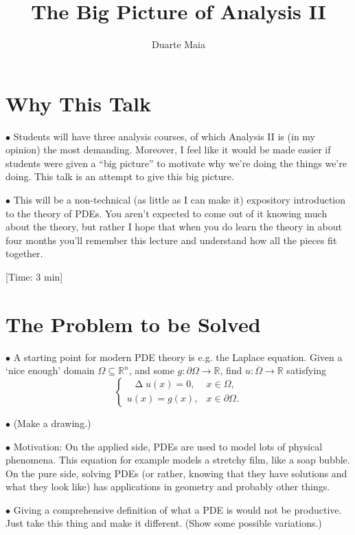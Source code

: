 \documentclass{article}
\title{The Big Picture of Analysis II}
\author{Duarte Maia}
\newcommand{\R}{\mathbb{R}}
\newcommand\closed[1]{\overline{#1}}
\newcommand{\lap}{\mathop{}\!\mathbin{\Delta}}
\newcommand\point[1]{\noindent \hspace{\labelsep} $\bullet$ #1 \smallskip}
\newcommand\timestamp[1]{\noindent \hspace{\labelsep} [Time: #1] \smallskip}
\begin{document}
\maketitle

\section{Why This Talk}

\point{Students will have three analysis courses, of which Analysis II is (in my opinion) the most demanding. Moreover, I feel like it would be made easier if students were given a ``big picture'' to motivate why we're doing the things we're doing. This talk is an attempt to give this big picture.}

\point{This will be a non-technical (as little as I can make it) expository introduction to the theory of PDEs. You aren't expected to come out of it knowing much about the theory, but rather I hope that when you do learn the theory in about four months you'll remember this lecture and understand how all the pieces fit together.}

\timestamp{3 min}

\section{The Problem to be Solved}

\point{A starting point for modern PDE theory is e.g. the Laplace equation. Given a `nice enough' domain $\Omega \subseteq \R^n$, and some $g \colon \partial\Omega \to \R$, find $u \colon \closed\Omega \to \R$ satisfying
\begin{equation}
\begin{cases}
\lap u(x) = 0, & x \in \Omega,\\
u(x) = g(x), & x \in \partial\Omega.
\end{cases}
\end{equation}
}

\point{(Make a drawing.)}

\point{Motivation: On the applied side, PDEs are used to model lots of physical phenomena. This equation for example models a stretchy film, like a soap bubble. On the pure side, solving PDEs (or rather, knowing that they have solutions and what they look like) has applications in geometry and probably other things.}

\point{Giving a comprehensive definition of what a PDE is would not be productive. Just take this thing and make it different. (Show some possible variations.)}
\end{document}
